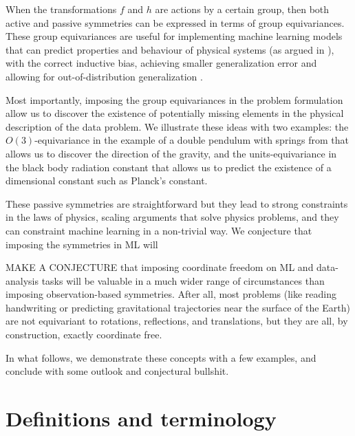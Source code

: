 \documentclass{article}
\begin{document}
When the transformations $f$ and $h$ are actions by a certain group, then both active and passive symmetries can be expressed in terms of group equivariances. These group equivariances are useful for implementing machine learning models that can predict properties and behaviour of physical systems (as argued in \cite{cheng2019covariance}), with the correct inductive bias, achieving smaller generalization error \cite{bietti2021sample, elesedy2021provably, elesedy2021kernel, mei2021learning} and allowing for out-of-distribution generalization \cite{villar2022dimensionless}. 

Most importantly, imposing the group equivariances in the problem formulation allow us to discover the existence of potentially missing elements in the physical description of the data problem. We illustrate these ideas with two examples: the $O(3)$-equivariance in the example of a double pendulum with springs from \cite{finzi2021practical, yao2021simple} that allows us to discover the direction of the gravity, and the units-equivariance in the black body radiation constant that allows us to predict the existence of a dimensional constant such as Planck's constant.

These passive symmetries are straightforward but they lead to strong constraints in the laws of physics, scaling arguments that solve physics problems, and they can constraint machine learning in a non-trivial way. We conjecture that imposing the symmetries in ML will 

MAKE A CONJECTURE that imposing coordinate freedom on ML and data-analysis tasks will be valuable in a much wider range of circumstances than imposing observation-based symmetries. After all, most problems (like reading handwriting or predicting gravitational trajectories near the surface of the Earth) are not equivariant to rotations, reflections, and translations, but they are all, by construction, exactly coordinate free.

In what follows, we demonstrate these concepts with a few examples, and conclude with some outlook and conjectural bullshit.

\section{Definitions and terminology}
\end{document}
